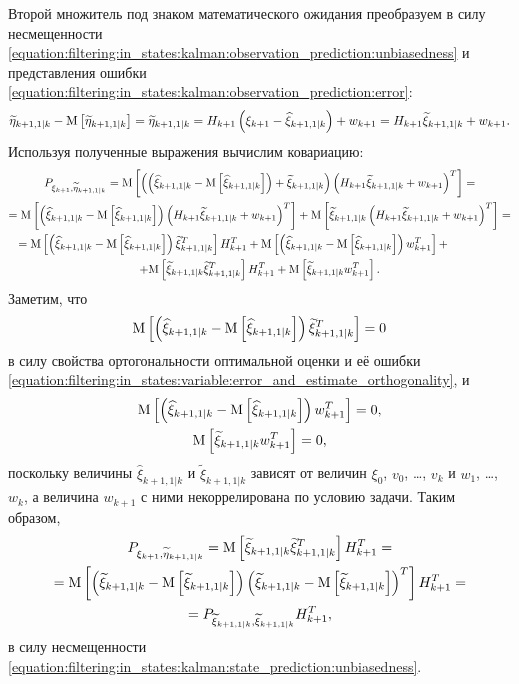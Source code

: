 Второй множитель под знаком математического ожидания преобразуем в силу несмещенности \eqref{equation:filtering:in_states:kalman:observation_prediction:unbiasedness}
и представления ошибки \eqref{equation:filtering:in_states:kalman:observation_prediction:error}:
$$
	\widetilde{\eta}_{k+1, 1|k} - \mathrm{M} \left [ \widetilde{\eta}_{k+1, 1|k} \right ]
		= \widetilde{\eta}_{k+1, 1|k}
		= H_{k+1} \left ( \xi_{k+1} - \widehat{\xi}_{k+1,1|k} \right ) + w_{k+1}
		= H_{k+1} \widetilde{\xi}_{k+1,1|k} + w_{k+1} .
$$
Используя полученные выражения вычислим ковариацию:
\begin{multline*}
	P_{\xi_{k+1}, \widetilde{\eta}_{k+1, 1|k}}
		= \expectation{\left ( \centered{\widehat{\xi}_{k+1,1|k}} + \widetilde{\xi}_{k+1,1|k} \right ) \left ( H_{k+1} \widetilde{\xi}_{k+1,1|k} + w_{k+1} \right )^T } = \\
	= \expectation{\centered{\widehat{\xi}_{k+1,1|k}} \left ( H_{k+1} \widetilde{\xi}_{k+1,1|k} + w_{k+1} \right )^T }
		+ \expectation{\widetilde{\xi}_{k+1,1|k} \left ( H_{k+1} \widetilde{\xi}_{k+1,1|k} + w_{k+1} \right )^T } = \\
	\shoveleft{
		= \expectation{\centered{\widehat{\xi}_{k+1,1|k}} \widetilde{\xi}_{k+1,1|k}^T} H_{k+1}^T
		+ \expectation{\centered{\widehat{\xi}_{k+1,1|k}} w_{k+1}^T } +
	} \\
	+ \expectation{\widetilde{\xi}_{k+1,1|k} \widetilde{\xi}_{k+1,1|k}^T } H_{k+1}^T
	+ \expectation{\widetilde{\xi}_{k+1,1|k} w_{k+1}^T } .
\end{multline*}
Заметим, что
$$
	\mathrm{M} \left [ \left ( \widehat{\xi}_{k+1,1|k} - \mathrm{M} \left [ \widehat{\xi}_{k+1,1|k} \right ] \right ) \widetilde{\xi}_{k+1,1|k}^T \right ] = 0
$$
в силу свойства ортогональности оптимальной оценки и её ошибки \eqref{equation:filtering:in_states:variable:error_and_estimate_orthogonality}, и
\begin{gather*}
	\mathrm{M} \left [ \left ( \widehat{\xi}_{k+1,1|k} - \mathrm{M} \left [ \widehat{\xi}_{k+1,1|k} \right ] \right ) w_{k+1}^T  \right ] = 0 , \\
	\mathrm{M} \left [ \widetilde{\xi}_{k+1,1|k} w_{k+1}^T  \right ] = 0 ,
\end{gather*}
поскольку величины $\widehat{\xi}_{k+1,1|k}$ и $\widetilde{\xi}_{k+1,1|k}$ зависят от величин $\xi_0$, $v_0$, \dots, $v_k$ и $w_1$, \dots, $w_k$, а величина
$w_{k+1}$ с ними некоррелирована по условию задачи. Таким образом,
\begin{multline} \label{equation:filtering:in_states:kalman:state_and_innovation:covariance}
	P_{\xi_{k+1}, \widetilde{\eta}_{k+1, 1|k}}
		= \mathrm{M} \left [ \widetilde{\xi}_{k+1,1|k} \widetilde{\xi}_{k+1,1|k}^T  \right ] H_{k+1}^T = \\
	= \mathrm{M} \left [ \left ( \widetilde{\xi}_{k+1,1|k} - \mathrm{M} \left [ \widetilde{\xi}_{k+1,1|k} \right ] \right ) \left ( \widetilde{\xi}_{k+1,1|k} - \mathrm{M} \left [ \widetilde{\xi}_{k+1,1|k} \right ] \right )^T  \right ] H_{k+1}^T = \\
	= P_{\widetilde{\xi}_{k+1,1|k}, \widetilde{\xi}_{k+1,1|k}} H_{k+1}^T ,
\end{multline}
в силу несмещенности \eqref{equation:filtering:in_states:kalman:state_prediction:unbiasedness}.

